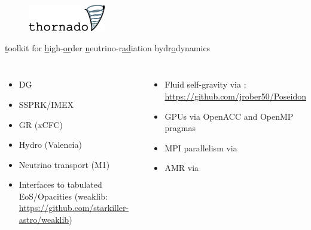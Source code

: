 \documentclass{beamer}
\begin{document}
\begin{frame}

  \begin{figure}[ht]
    \centering
    \includegraphics[width=0.3\textwidth]{fig.thornado_logo.png}
  \end{figure}

  \begin{center}

    \ul{t}oolkit for
    \ul{h}igh-\ul{or}der
    \ul{n}eutrino-r\ul{ad}iation hydr\ul{o}dynamics\\[1em]

    \begin{columns}[c]


        \begin{itemize}
          \item
            DG
          \item
            SSPRK/IMEX
          \item
            GR (xCFC)
          \item
            Hydro (Valencia)
          \item
            Neutrino transport (M1)
          \item
            Interfaces to tabulated EoS/Opacities
            (weaklib: \url{https://github.com/starkiller-astro/weaklib})
        \end{itemize}


        \begin{itemize}
          \item
            Fluid self-gravity via \poseidon:
            \url{https://github.com/jrober50/Poseidon}
          \item
            GPUs via OpenACC and OpenMP pragmas
          \item
            MPI parallelism via \amrex
          \item
            AMR via \amrex
        \end{itemize}

    \end{columns}

  \end{center}

\end{frame}
\end{document}
